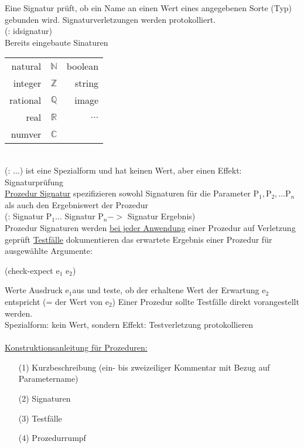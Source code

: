 Eine Signatur pr\"uft, ob ein Name an einen Wert eines angegebenen Sorte (Typ) gebunden wird. Signaturverletzungen werden protokolliert.\\
(: \auf id\zu \auf signatur\zu)\\
Bereits eingebaute Sinaturen\\
\begin{tabular}{rcr}
natural&$\mathbb{N}$& boolean\\
integer&$\mathbb{Z}$& string\\
rational&$\mathbb{Q}$& image\\
real&$\mathbb{R}$&$\ldots$\\
numver&$\mathbb{C}$
\end{tabular}\\
(: $\ldots$) ist eine Spezialform und hat keinen Wert, aber einen Effekt: Signaturpr\"ufung\\
\underline{Prozedur Signatur} spezifizieren sowohl Signaturen f\"ur die Parameter $\text{P}_1,\text{P}_2,\ldots\text{P}_n$ als auch den Ergebniswert der Prozedur\\
(: \auf Signatur $\text{P}_1$\zu $\ldots$ \auf Signatur $\text{P}_n$\zu $->$ \auf Signatur Ergebnis\zu)\\
Prozedur Signaturen werden \underline{bei jeder Anwendung} einer Prozedur auf Verletzung gepr\"uft \underline{Testf\"alle} dokumentieren das erwartete Ergebnis einer Prozedur f\"ur ausgew\"ahlte Argumente:\\
\begin{center}
(check-expect \auf $\text{e}_1$\zu \auf
$\text{e}_2$\zu)\end{center}
Werte Ausdruck \auf $\text{e}_1$\zu aus und teste, ob der erhaltene Wert der Erwartung \auf $\text{e}_2$\zu entspricht (= der Wert von \auf $\text{e}_2$\zu)
Einer Prozedur sollte Testf\"alle direkt vorangestellt werden.\\
Spezialform: kein Wert, sondern Effekt: Testverletzung protokollieren\\
\linie\\
\underline{Konstruktionsanleitung f\"ur Prozeduren:}
\begin{enumerate}
\item[(1)]Kurzbeschreibung (ein- bis zweizeiliger Kommentar mit Bezug auf Parametername)
\item[(2)]Signaturen
\item[(3)]Testf\"alle
\item[(4)]Prozedurrumpf
\end{enumerate}
\linie\\
